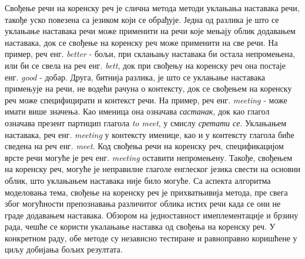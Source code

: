 Свођење речи на коренску реч је слична метода методи уклањања наставака речи, такође уско повезена са језиком који се обрађује. Једна од  разлика је што се уклањање наставака речи може применити на речи које мењају облик додавањем наставака, док се свођење на коренску реч може применити на све речи. На пример,  реч енг. \textit{better} - бољи, при склањању наставака би остала непромењена,  или би се свела на реч енг. \textit{bett},  док при свођењу на коренску реч она постаје енг. \textit{good} - добар.
Друга, битнија разлика, је што се уклањање наставака примењује на речи, не водећи рачуна о контексту, док се свођењем на коренску реч може специфицирати и контекст речи. На пример, реч енг. \textit{meeting} - може имати више значења. Као именица она означава \textit{састанак}, док као глагол означава презент партицип глагола \textit{to meet}, у смислу \textit{сретати се}. Уклањањем наставака, реч енг. \textit{meeting}  у контексту именице, као и у контексту глагола биће сведена на реч енг. \textit{meet}. Код свођења речи на коренску реч, спецификацијом врсте речи могуће је реч енг. \textit{meeting} оставити непромењену.
Такође, свођењем на коренску реч, могуће је неправилне глаголе енглеског језика свести на основни облик, што уклањањем наставака није било могуће. 
Са аспекта алгоритма моделовања тема, свођење на коренску реч је прихватњивија метода, пре свега због могућности препознавања различитог облика истих речи када се они не граде додавањем наставака.
Обзором на једноставност имеплементације и брзину рада, чешће се користи укалањање наставка од свођења на коренску реч. У конкретном раду, обе методе су независно тестиране и равноправно коришћене у циљу добијања бољих резултата.
	

